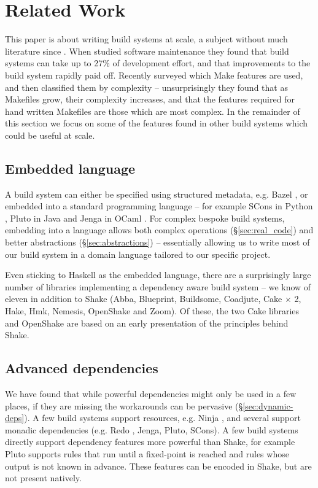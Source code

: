 \section{Related Work\label{section-review}}

This paper is about writing build systems at scale, a subject without much
literature since \citet{miller:recursive_make}. When
\citet{mcintosh:build_maintenance_effort} studied software maintenance they
found that build systems can take up to 27\% of
development effort, and that improvements to the build system rapidly paid off.
Recently \citet{martin:make_it_simple} surveyed which Make features are used,
and then \citet{martin:maintenance_complexity_makefiles} classified them by
complexity -- unsurprisingly they found that as Makefiles grow, their complexity
increases, and that the features required for hand written Makefiles are those
which are most complex. In the remainder of this section we focus on some of the
features found in other build systems which could be useful at scale.

\subsection{Embedded language}

A build system can either be specified using structured metadata, e.g. Bazel
\cite{bazel}, or embedded into a standard programming language -- for example
SCons in Python \cite{scons}, Pluto in Java \cite{pluto} and Jenga in OCaml
\cite{jenga}. For complex bespoke build systems, embedding into a language
allows both complex operations (\S\ref{sec:real_code}) and better abstractions
(\S\ref{sec:abstractions}) -- essentially allowing us to write most of our build
system in a domain language tailored to our specific project.

Even sticking to Haskell as the embedded language, there are a surprisingly
large number of libraries implementing a dependency aware build system -- we
know of eleven in addition to Shake (Abba, Blueprint, Buildsome, Coadjute, Cake
$\times$ 2, Hake, Hmk, Nemesis, OpenShake and Zoom). Of these, the two Cake
libraries and OpenShake are based on an early presentation of the principles behind Shake.

\subsection{Advanced dependencies}

We have found that while powerful dependencies might only be used in a few
places, if they are missing the workarounds can be pervasive
(\S\ref{sec:dynamic-deps}). A few build systems support resources, e.g.
Ninja \cite{ninja}, and several support monadic dependencies (e.g. Redo
\cite{redo}, Jenga, Pluto, SCons). A few build systems directly support
dependency features more powerful than Shake, for example Pluto supports rules
that run until a fixed-point is reached and rules whose output is not known in
advance. These features can be encoded in Shake, but are not present natively.

